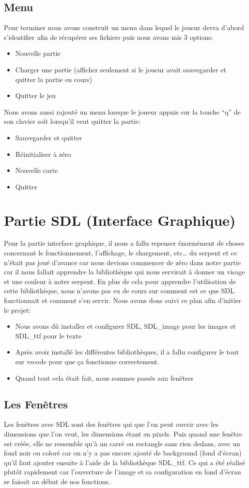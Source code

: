 \documentclass{article}
\begin{document}
\subsection{Menu}
Pour terminer nous avons construit un menu dans lequel le joueur devra d’abord s’identifier afin de récupérer ses fichiers puis nous avons mis 3 options:
\begin{itemize}
    \item Nouvelle partie
    \item Charger une partie (afficher seulement si le joueur avait sauvegarder et quitter la partie en cours)
    \item Quitter le jeu
\end{itemize}
Nous avons aussi rajouté un menu lorsque le joueur appuie sur la touche “q” de son clavier soit lorsqu’il veut quitter la partie:
\begin{itemize}
    \item Sauvegarder et quitter
    \item Réinitialiser à zéro
    \item Nouvelle carte
    \item Quitter
\end{itemize}
\section{Partie SDL (Interface Graphique)}
Pour la partie interface graphique, il nous a fallu repenser énormément de choses concernant le fonctionnement, l’affichage, le chargement, etc… du serpent et ce n’était pas joué d’avance car nous devions commencer de zéro dans notre partie car il nous fallait apprendre la bibliothèque qui nous servirait à donner un visage et une couleur à notre serpent.
En plus de cela pour apprendre l’utilisation de cette bibliothèque, nous n’avons pas eu de cours sur comment est ce que SDL fonctionnait et comment s’en servir.
Nous avons donc suivi ce plan afin d’initier le projet:
\begin{itemize}
    \item Nous avons dû installer et configurer SDL, SDL\_image pour les images et SDL\_ttf pour le texte
    \item Après avoir installé les différentes bibliothèques, il a fallu configurer le tout sur vscode pour que ça fonctionne correctement.
    \item Quand tout cela était fait, nous sommes passés aux fenêtres
\end{itemize}
\subsection{Les Fenêtres}
Les fenêtres avec SDL sont des fenêtres qui que l’on peut ouvrir avec les dimensions que l’on veut, les dimensions étant en pixels. Puis quand une fenêtre est créée, elle ne ressemble qu’à un carré ou rectangle sans rien dedans, avec un fond noir ou coloré car on n’y a pas encore ajouté de background (fond d’écran) qu’il faut ajouter ensuite à l’aide de la bibliothèque SDL\_ttf. Ce qui a été réalisé plutôt rapidement car l’ouverture de l’image et sa configuration en fond d’écran se faisait au début de nos fonctions.
\end{document}
